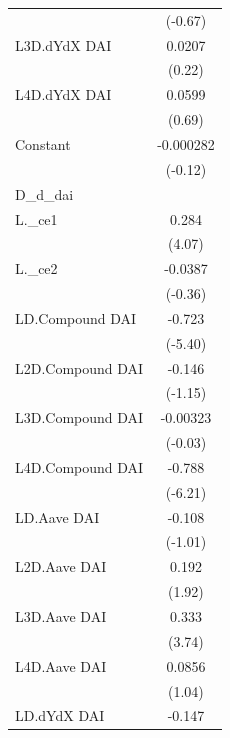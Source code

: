 {\begin{tabular}{l*{1}{c}}
                    &     (-0.67)         \\
\addlinespace
L3D.dYdX DAI        &      0.0207         \\
                    &      (0.22)         \\
\addlinespace
L4D.dYdX DAI        &      0.0599         \\
                    &      (0.69)         \\
\addlinespace
Constant            &   -0.000282         \\
                    &     (-0.12)         \\
\midrule
D\_d\_dai             &                     \\
L.\_ce1              &       0.284\sym{***}\\
                    &      (4.07)         \\
\addlinespace
L.\_ce2              &     -0.0387         \\
                    &     (-0.36)         \\
\addlinespace
LD.Compound DAI     &      -0.723\sym{***}\\
                    &     (-5.40)         \\
\addlinespace
L2D.Compound DAI    &      -0.146         \\
                    &     (-1.15)         \\
\addlinespace
L3D.Compound DAI    &    -0.00323         \\
                    &     (-0.03)         \\
\addlinespace
L4D.Compound DAI    &      -0.788\sym{***}\\
                    &     (-6.21)         \\
\addlinespace
LD.Aave DAI         &      -0.108         \\
                    &     (-1.01)         \\
\addlinespace
L2D.Aave DAI        &       0.192         \\
                    &      (1.92)         \\
\addlinespace
L3D.Aave DAI        &       0.333\sym{***}\\
                    &      (3.74)         \\
\addlinespace
L4D.Aave DAI        &      0.0856         \\
                    &      (1.04)         \\
\addlinespace
LD.dYdX DAI         &      -0.147         \\

\end{tabular}}
